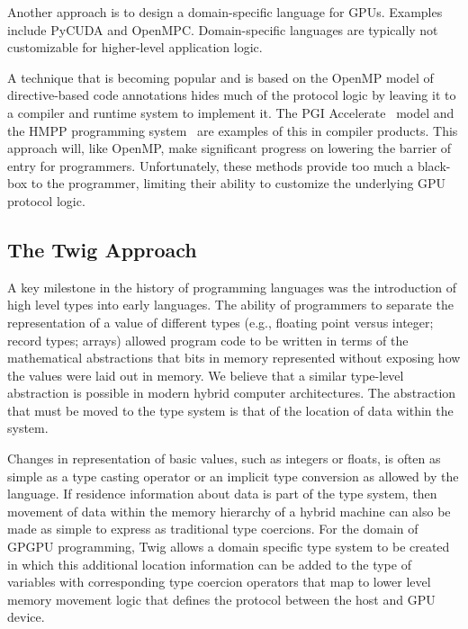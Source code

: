 Another approach is to design a domain-specific language for GPUs. Examples
include PyCUDA and OpenMPC. Domain-specific languages are typically not
customizable for higher-level application logic.

A technique that is becoming popular and is based on the OpenMP model of
directive-based code annotations hides much of the protocol logic by leaving
it to a compiler and runtime system to implement it. The PGI
Accelerate~\cite{pgi-accelerate} model and the HMPP programming
system~\cite{hmpp} are examples of this in compiler products. This approach
will, like OpenMP, make significant progress on lowering the barrier of entry
for programmers. Unfortunately, these methods provide too much a black-box to
the programmer, limiting their ability to customize the underlying GPU
protocol logic.

\subsection{The Twig Approach}


A key milestone in the history of programming languages was the introduction
of high level types into early languages. The ability of programmers to
separate the representation of a value of different types (e.g., floating
point versus integer; record types; arrays) allowed program code to be written
in terms of the mathematical abstractions that bits in memory represented
without exposing how the values were laid out in memory. We believe that a
similar type-level abstraction is possible in modern hybrid computer
architectures. The abstraction that must be moved to the type system is that
of the location of data within the system.

Changes in representation of basic values, such as integers or floats, is
often as simple as a type casting operator or an implicit type conversion as
allowed by the language. If residence information about data is part of the
type system, then movement of data within the memory hierarchy of a hybrid
machine can also be made as simple to express as traditional type coercions.
For the domain of GPGPU programming, Twig allows a domain specific type system
to be created in which this additional location information can be added to
the type of variables with corresponding type coercion operators that map to
lower level memory movement logic that defines the protocol between the host
and GPU device.

